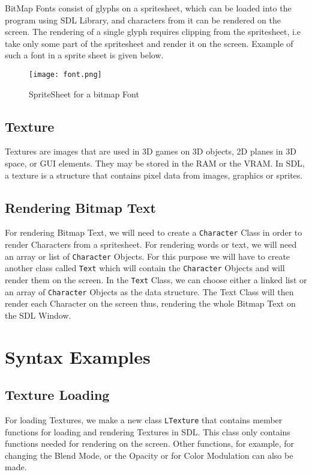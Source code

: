 \documentclass[11pt,fleqn]{book} %
\begin{document}
BitMap Fonts consist of glyphs on a spritesheet, which can be loaded into the program using SDL Library, and characters from it can be rendered on the screen. The rendering of a single glyph requires clipping from the spritesheet, i.e take only some part of the spritesheet and render it on the screen. Example of such a font in a sprite sheet is given below.

\begin{figure}[h]
    \centering
    \texttt{[image: font.png]}
    \caption{SpriteSheet for a bitmap Font}
\end{figure}


\subsection{Texture}

Textures are images that are used in 3D games on 3D objects, 2D planes in 3D space, or GUI elements. They may be stored in the RAM or the VRAM. In SDL, a texture is a structure that contains pixel data from images, graphics or sprites. 

\subsection{Rendering Bitmap Text}

For rendering Bitmap Text, we will need to create a \texttt{Character} Class in order to render Characters from a spritesheet. For rendering words or text, we will need an array or list of \texttt{Character} Objects. For this purpose we will have to create another class called \texttt{Text} which will contain the \texttt{Character} Objects and will render them on the screen. In the \texttt{Text} Class, we can choose either a linked list or an array of \texttt{Character} Objects as the data structure. The Text Class will then render each Character on the screen thus, rendering the whole Bitmap Text on the SDL Window.

\section{Syntax Examples}

\subsection{Texture Loading}

For loading Textures, we make a new class \texttt{LTexture} that contains member functions for loading and rendering Textures in SDL. This class only contains functions needed for rendering on the screen. Other functions, for example, for changing the Blend Mode, or the Opacity or for Color Modulation can also be made.
\end{document}
